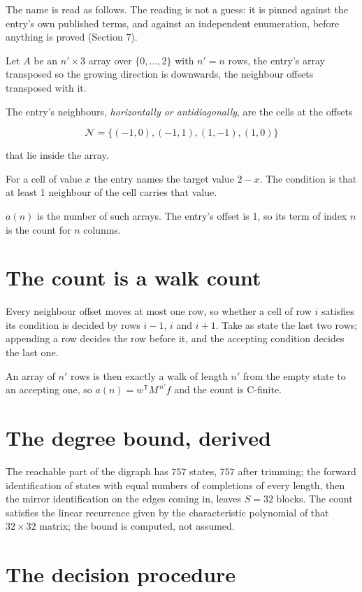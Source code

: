\documentclass[11pt]{article}
\theoremstyle{definition}
\begin{document}
The name is read as follows. The reading is not a guess: it is pinned against the entry's own published terms, and against an independent enumeration, before anything is proved (Section 7).

Let $A$ be an $n' \times 3$ array over $\{0,\dots,2\}$ with $n' = n$ rows, the entry's array transposed so the growing direction is downwards, the neighbour offsets transposed with it.

The entry's neighbours, {\itshape horizontally or antidiagonally}, are the cells at the offsets

\[\mathcal{N} = \{(-1,0), (-1,1), (1,-1), (1,0)\}\]

that lie inside the array.

For a cell of value $x$ the entry names the target value $2 - x$. The condition is that at least 1 neighbour of the cell carries that value.

$a(n)$ is the number of such arrays. The entry's offset is 1, so its term of index $n$ is the count for $n$ columns.

\section{The count is a walk count}

Every neighbour offset moves at most one row, so whether a cell of row $i$ satisfies its condition is decided by rows $i-1$, $i$ and $i+1$. Take as state the last two rows; appending a row decides the row before it, and the accepting condition decides the last one.

An array of $n'$ rows is then exactly a walk of length $n'$ from the empty state to an accepting one, so $a(n) = w^{\mathsf T}M^{\,n'}f$ and the count is C-finite.

\section{The degree bound, derived}

The reachable part of the digraph has $757$ states, $757$ after trimming; the forward identification of states with equal numbers of completions of every length, then the mirror identification on the edges coming in, leaves $S = 32$ blocks. The count satisfies the linear recurrence given by the characteristic polynomial of that $32\times32$ matrix; the bound is computed, not assumed.

\section{The decision procedure}
\end{document}
